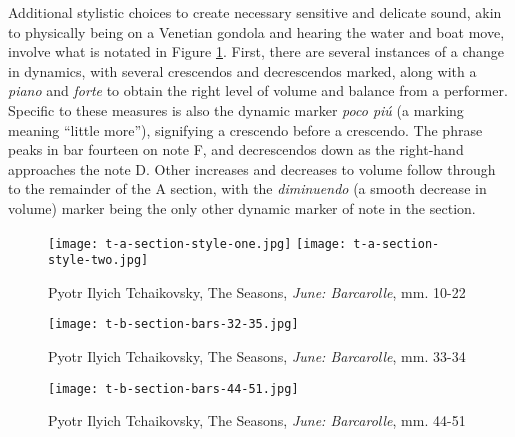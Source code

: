 Additional stylistic choices to create necessary sensitive and delicate sound, akin to physically being on a Venetian gondola and hearing the water and boat move, involve what is notated in Figure \ref{fig:t-a-section-style-choices}\autocite{Henle_2002}. First, there are several instances of a change in dynamics, with several crescendos and decrescendos marked, along with a \textit{piano} and \textit{forte} to obtain the right level of volume and balance from a performer. Specific to these measures is also the dynamic marker \textit{poco piú} (a marking meaning ``little more''), signifying a crescendo before a crescendo. The phrase peaks in bar fourteen on note F, and decrescendos down as the right-hand approaches the note D. Other increases and decreases to volume follow through to the remainder of the A section, with the \textit{diminuendo} (a smooth decrease in volume) marker being the only other dynamic marker of note in the section.

\begin{figure}[h]
  \centering
  \texttt{[image: t-a-section-style-one.jpg]}
  \texttt{[image: t-a-section-style-two.jpg]}
  \caption{Pyotr Ilyich Tchaikovsky, The Seasons, \textit{June: Barcarolle}, mm. 10-22}
  \label{fig:t-a-section-style-choices}
\end{figure}

\begin{figure}
  \centering
  \texttt{[image: t-b-section-bars-32-35.jpg]}
  \caption{Pyotr Ilyich Tchaikovsky, The Seasons, \textit{June: Barcarolle}, mm. 33-34}
  \label{fig:t-b-section-bars-32-35}
\end{figure}

\begin{figure}
  \centering
  \texttt{[image: t-b-section-bars-44-51.jpg]}
  \caption{Pyotr Ilyich Tchaikovsky, The Seasons, \textit{June: Barcarolle}, mm. 44-51}
  \label{fig:t-b-section-bars-44-51}
\end{figure}


